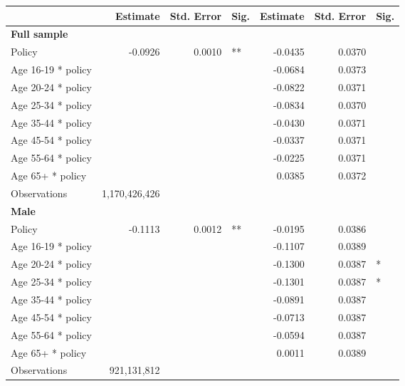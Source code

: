
\begin{table}%
\centering 
\begin{tabular}{l r r l r r l} 

\hline 
 
 & Estimate & Std. Error & Sig. & Estimate & Std. Error & Sig. \\ 

\hline 
 
\textbf{Full sample} \\ 

Policy             &  -0.0926        &  0.0010       &   **       &  -0.0435        &  0.0370       &            \\ 
Age 16-19 * policy           & & &  &  -0.0684        &  0.0373       &            \\ 
Age 20-24 * policy           & & &  &  -0.0822        &  0.0371       &            \\ 
Age 25-34 * policy           & & &  &  -0.0834        &  0.0370       &            \\ 
Age 35-44 * policy           & & &  &  -0.0430        &  0.0371       &            \\ 
Age 45-54 * policy           & & &  &  -0.0337        &  0.0371       &            \\ 
Age 55-64 * policy           & & &  &  -0.0225        &  0.0371       &            \\ 
Age 65+ * policy           & & &  &  0.0385        &  0.0372       &            \\ 
Observations & 1,170,426,426 \\ 


\hline 

\textbf{Male} \\ 

Policy             &  -0.1113        &  0.0012       &   **       &  -0.0195        &  0.0386       &            \\ 
Age 16-19 * policy           & & &  &  -0.1107        &  0.0389       &            \\ 
Age 20-24 * policy           & & &  &  -0.1300        &  0.0387       &    *       \\ 
Age 25-34 * policy           & & &  &  -0.1301        &  0.0387       &    *       \\ 
Age 35-44 * policy           & & &  &  -0.0891        &  0.0387       &            \\ 
Age 45-54 * policy           & & &  &  -0.0713        &  0.0387       &            \\ 
Age 55-64 * policy           & & &  &  -0.0594        &  0.0387       &            \\ 
Age 65+ * policy           & & &  &  0.0011        &  0.0389       &            \\ 
Observations & 921,131,812 \\ 



\end{tabular}
\end{table}

